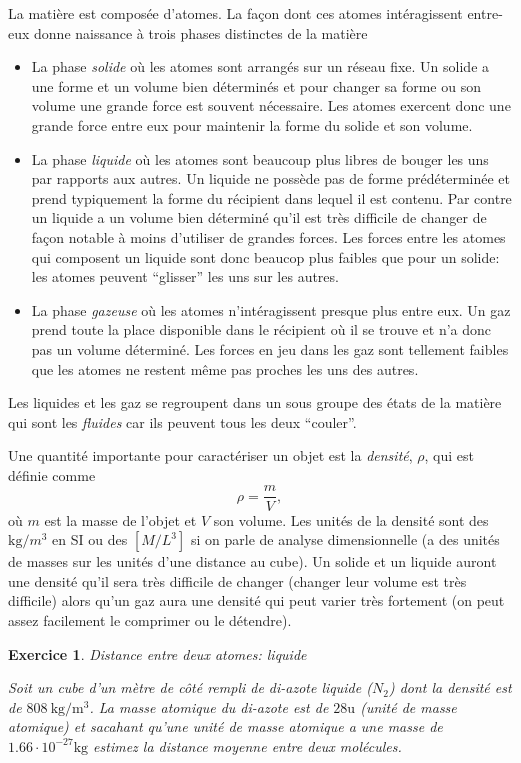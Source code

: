 \documentclass[a4paper,12pt]{book}
\newtheorem{exercice}{Exercice}
\newcommand{\m}{\mathrm{m}}
\newcommand{\kg}{\mathrm{kg}}
\begin{document}
La matière est composée d'atomes. La façon dont ces atomes intéragissent entre-eux donne naissance à
trois phases distinctes de la matière
\begin{itemize}
 \item La phase \textit{solide} où les atomes sont arrangés sur un réseau fixe. Un solide a une forme et un volume bien déterminés et pour
 changer sa forme ou son volume une grande force est souvent nécessaire. Les atomes exercent donc une grande force entre eux pour maintenir 
 la forme du solide et son volume.
 \item La phase \textit{liquide} où les atomes sont beaucoup plus libres de bouger les uns par rapports aux autres. Un liquide ne possède pas
 de forme prédéterminée et prend typiquement la forme du récipient dans lequel il est contenu. Par contre un liquide a un volume bien déterminé
 qu'il est très difficile de changer de façon notable à moins d'utiliser de grandes forces. 
 Les forces entre les atomes qui composent un liquide sont donc beaucop
 plus faibles que pour un solide: les atomes peuvent ``glisser'' les uns sur les autres.
 \item La phase \textit{gazeuse} où les atomes n'intéragissent presque plus entre eux. Un gaz prend toute la place disponible dans le récipient où il se trouve
 et n'a donc pas un volume déterminé. Les forces en jeu dans les gaz sont tellement faibles que les atomes ne restent même pas proches les uns
 des autres.
\end{itemize}
Les liquides et les gaz se regroupent dans un sous groupe des états de la matière qui sont les \textit{fluides} car ils peuvent tous les deux ``couler''.

Une quantité importante pour caractériser un objet est la \textit{densité}, $\rho$, qui est définie comme
\begin{equation}
 \rho=\frac{m}{V},
\end{equation}
où $m$ est la masse de l'objet et $V$ son volume. Les unités de la densité sont des $\kg/m^3$ en SI ou des $[M/L^3]$ si on parle de analyse dimensionnelle
(a des unités de masses sur les unités d'une distance au cube). Un solide et un liquide auront une densité qu'il sera très difficile de changer (changer leur volume est
très difficile) alors qu'un gaz aura une densité qui peut varier très fortement (on peut assez facilement le comprimer ou le détendre).


\begin{exercice}{Distance entre deux atomes: liquide}

Soit un cube d'un mètre de côté rempli de di-azote liquide ($N_2$) dont la densité est de 
$808\ \kg/\m^3$. La masse atomique du di-azote est de $28\mathrm{u}$ (unité de masse atomique) et 
sacahant qu'une unité de masse atomique a une masse de $1.66\cdot 10^{-27}\kg$ estimez
la distance moyenne entre deux molécules.
\end{exercice}
\end{document}
